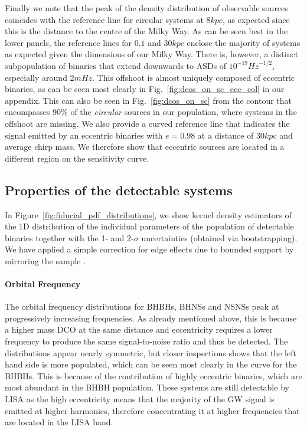 Finally we note that the peak of the density distribution of observable sources coincides with the reference line for circular systems at $8 \unit{kpc}$, as expected since this is the distance to the centre of the Milky Way. As can be seen best in the lower panels, the reference lines for $0.1$ and $30 \unit{kpc}$ enclose the majority of systems as expected given the dimensions of our Milky Way. There is, however, a distinct subpopulation of binaries that extend downwards to ASDs of $10^{-19} \unit{Hz}^{-1/2}$, especially around $2 \unit{mHz}$. This offshoot is almost uniquely composed of eccentric binaries, as can be seen most clearly in Fig.~\ref{fig:dcos_on_sc_ecc_col} in our appendix. This can also be seen in Fig.~\ref{fig:dcos_on_sc} from the contour that encompasses 90\% of the \textit{circular} sources in our population, where systems in the offshoot are missing. We also provide a curved reference line that indicates the signal emitted by an eccentric binaries with $e = 0.98$ at a distance of $30 \unit{kpc}$ and average chirp mass. We therefore show that eccentric sources are located in a different region on the sensitivity curve.

\subsection{Properties of the detectable systems}\label{sec:fiducial_distributions}
In Figure~\ref{fig:fiducial_pdf_distributions}, we show kernel density estimators of the 1D distribution of the individual parameters of the population of detectable binaries together with the 1- and 2-$\sigma$ uncertainties (obtained via bootstrapping). We have applied a simple correction for edge effects due to bounded support by mirroring the sample \citep{Schuster+1985}.

\paragraph{Orbital Frequency} The orbital frequency distributions for BHBHs, BHNSs and NSNSs peak at progressively increasing frequencies. As already mentioned above, this is because a higher mass DCO at the same distance and eccentricity requires a lower frequency to produce the same signal-to-noise ratio and thus be detected. The distributions appear nearly symmetric, but closer inspections shows that the left hand side is more populated, which can be seen most clearly in the curve for the BHBHs. This is because of the contribution of highly eccentric binaries, which are most abundant in the BHBH population. These systems are still detectable by LISA as the high eccentricity means that the majority of the GW signal is emitted at higher harmonics, therefore concentrating it at higher frequencies that are located in the LISA band.

